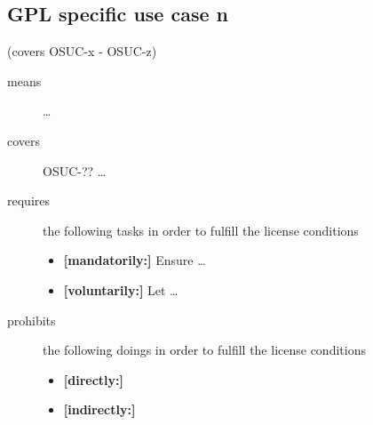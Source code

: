 \subsection{GPL specific use case n}
(covers OSUC-x - OSUC-z)
\begin{description}
\item[means] \ldots

\item[covers] OSUC-?? \ldots

\item[requires] the following tasks in order to fulfill the license conditions
\begin{itemize}
  \item \textbf{[mandatorily:]} Ensure \ldots
  \item \textbf{[voluntarily:]} Let \ldots
\end{itemize}

\item[prohibits] the following doings in order to fulfill the license conditions
\begin{itemize}
  \item \textbf{[directly:]} 
  \item \textbf{[indirectly:]}
\end{itemize}
\end{description}
%
